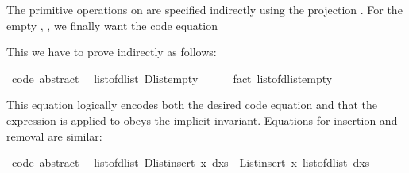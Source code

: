 \begin{isabellebody}
\begin{isamarkuptext}
  The primitive operations on  are specified
  indirectly using the projection .  For
  the empty , , we finally want
  the code equation%
\end{isamarkuptext}%
\isamarkuptrue%
%
\isadelimquote
%
\endisadelimquote
%
\isatagquote
%
\begin{isamarkuptext}%
%
\end{isamarkuptext}%
\isamarkuptrue%
%
\endisatagquote
{\isafoldquote}%
%
\isadelimquote
%
\endisadelimquote
%
\begin{isamarkuptext}%
\noindent This we have to prove indirectly as follows:%
\end{isamarkuptext}%
\isamarkuptrue%
%
\isadelimquote
%
\endisadelimquote
%
\isatagquote
{}\isamarkupfalse%
\ {}code\ abstract{}{}\isanewline
\ \ {}list{}of{}dlist\ Dlist{}empty\ {}\ {}{}{}\isanewline
\ \ \isamarkupfalse%
\ {}fact\ list{}of{}dlist{}empty{}%
\endisatagquote
{\isafoldquote}%
%
\isadelimquote
%
\endisadelimquote
%
\begin{isamarkuptext}%
\noindent This equation logically encodes both the desired code
  equation and that the expression  is applied to obeys
  the implicit invariant.  Equations for insertion and removal are
  similar:%
\end{isamarkuptext}%
\isamarkuptrue%
%
\isadelimquote
%
\endisadelimquote
%
\isatagquote
{}\isamarkupfalse%
\ {}code\ abstract{}{}\isanewline
\ \ {}list{}of{}dlist\ {}Dlist{}insert\ x\ dxs{}\ {}\ List{}insert\ x\ {}list{}of{}dlist\ dxs{}{}\isanewline

\end{isabellebody}

